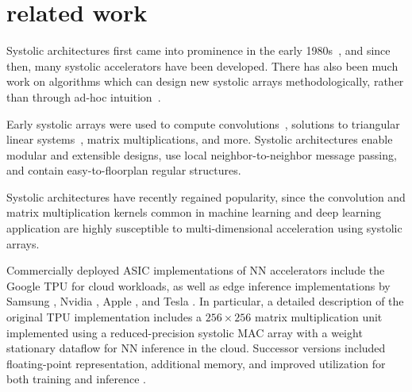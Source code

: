 \section{related work}
Systolic architectures first came into prominence in the early 1980s~\cite{why-systolic, kung1979systolic}, and since then, many systolic accelerators have been developed.
There has also been much work on algorithms which can design new systolic arrays methodologically, rather than through ad-hoc intuition~\cite{algoinfo}.

Early systolic arrays were used to compute convolutions~\cite{kungconv}, solutions to triangular linear systems~\cite{why-systolic}, matrix multiplications, and more. Systolic architectures enable modular and extensible designs, use local neighbor-to-neighbor message passing, and contain easy-to-floorplan regular structures.

Systolic architectures have recently regained popularity, since the convolution and matrix multiplication kernels common in machine learning and deep learning application are highly susceptible to multi-dimensional acceleration using systolic arrays.  

Commercially deployed ASIC implementations of NN accelerators include the Google TPU \cite{tpu} for cloud workloads, as well as edge inference implementations by Samsung \cite{samsung}, Nvidia \cite{nvidia}, Apple \cite{apple}, and Tesla \cite{bannon2019accelerated, bannon2019systems}. In particular, a detailed description of the original TPU implementation includes a $256\times256$ matrix multiplication unit implemented using a reduced-precision systolic MAC array with a weight stationary dataflow for NN inference in the cloud. Successor versions included floating-point representation, additional memory, and improved utilization for both training and inference \cite{tpu2_3}.


